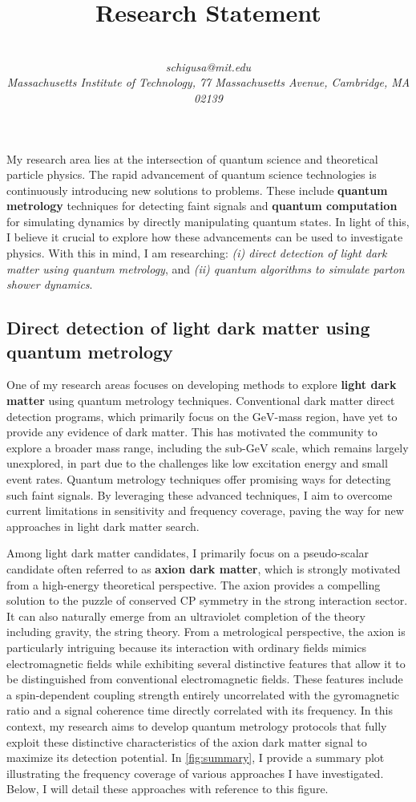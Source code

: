 \documentclass[12pt]{article}
\title{{\Large Research Statement}}
\author{
  \indent{\large So Chigusa}\\
  \indent\textit{schigusa@mit.edu}\\
  \indent\textit{Massachusetts Institute of Technology, 77 Massachusetts Avenue, Cambridge, MA 02139}
}
\date{\vspace{-3em}}
\begin{document}
\maketitle

My research area lies at the intersection of quantum science and theoretical particle physics.
The rapid advancement of quantum science technologies is continuously introducing new solutions to problems.
These include \textbf{quantum metrology} techniques for detecting faint signals and \textbf{quantum computation} for simulating dynamics by directly manipulating quantum states.
In light of this, I believe it crucial to explore how these advancements can be used to investigate physics.
With this in mind, I am researching: \textit{(i) direct detection of light dark matter using quantum metrology}, and \textit{(ii) quantum algorithms to simulate parton shower dynamics}.

\subsection*{Direct detection of light dark matter using quantum metrology}

One of my research areas focuses on developing methods to explore \textbf{light dark matter} using quantum metrology techniques.
Conventional dark matter direct detection programs, which primarily focus on the $\mathrm{GeV}$-mass region, have yet to provide any evidence of dark matter.
This has motivated the community to explore a broader mass range, including the sub-$\mathrm{GeV}$ scale, which remains largely unexplored, in part due to the challenges like low excitation energy and small event rates.
Quantum metrology techniques offer promising ways for detecting such faint signals.
By leveraging these advanced techniques, I aim to overcome current limitations in sensitivity and frequency coverage, paving the way for new approaches in light dark matter search.

Among light dark matter candidates, I primarily focus on a pseudo-scalar candidate often referred to as \textbf{axion dark matter}, which is strongly motivated from a high-energy theoretical perspective.
The axion provides a compelling solution to the puzzle of conserved CP symmetry in the strong interaction sector.
It can also naturally emerge from an ultraviolet completion of the theory including gravity, the string theory.
From a metrological perspective, the axion is particularly intriguing because its interaction with ordinary fields mimics electromagnetic fields while exhibiting several distinctive features that allow it to be distinguished from conventional electromagnetic fields.
These features include a spin-dependent coupling strength entirely uncorrelated with the gyromagnetic ratio and a signal coherence time directly correlated with its frequency.
In this context, my research aims to develop quantum metrology protocols that fully exploit these distinctive characteristics of the axion dark matter signal to maximize its detection potential.
In \cref{fig:summary}, I provide a summary plot illustrating the frequency coverage of various approaches I have investigated.
Below, I will detail these approaches with reference to this figure.
\end{document}
